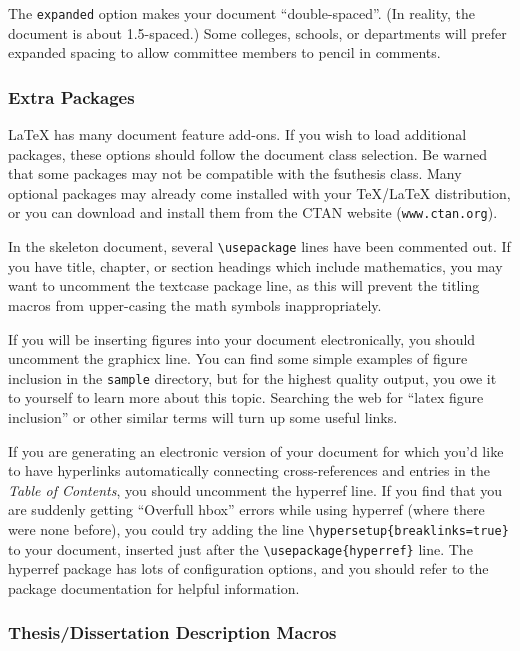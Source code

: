 \documentclass[11pt,letterpaper]{article}
\newcommand*{\acro}[1]{{\small\textsc{#1}}}
\newcommand*{\complit}[1]{\texttt{#1}}
\newcommand*{\latexclass}[1]{\textsf{#1}}
\newcommand*{\fsuth}{\latexclass{fsuthesis}}
\renewcommand{\-}{\discretionary{}{}{}}
\begin{document}
The \complit{expanded} option makes your document ``double-spaced''.
(In reality, the document is about 1.5-spaced.)  Some colleges, schools, or
departments will prefer expanded spacing to allow committee members to
pencil in comments.

\subsubsection{Extra Packages}

\LaTeX{} has many document feature add-ons.  If you wish to load
additional packages, these options should follow the document class
selection.  Be warned that some packages may not be compatible with
the \fsuth{} class.  Many optional packages may already come installed
with your \TeX/\LaTeX{} distribution, or you can download and install
them from the \acro{CTAN} website ({\tt www.ctan.org}).

In the skeleton document, several \verb|\usepackage| lines have
been commented out.  If you have title, chapter, or section headings
which include mathematics, you may want to uncomment the
\latexclass{textcase} package line, as this will prevent the
titling macros from upper-casing the math symbols inappropriately.

If you will be inserting figures into your document electronically,
you should uncomment the \latexclass{graphicx} line.  You can find
some simple examples of figure inclusion in the \complit{sample}
directory, but for the highest quality output, you owe it to yourself
to learn more about this topic.  Searching the web for ``latex figure
inclusion'' or other similar terms will turn up some useful links.

If you are generating an electronic version of your document
for which you'd like to have hyperlinks automatically connecting
cross-references and entries in the \textsl{Table of Contents}, you
should uncomment the \latexclass{hyperref} line.  If you find that you
are suddenly getting ``Overfull hbox'' errors while using
\latexclass{hyperref} (where there were none before), you could try
adding the line \verb+\hypersetup{breaklinks=true}+ to your document,
inserted just after the \verb+\usepackage{hyperref}+ line.  The
\latexclass{hyperref} package has lots of configuration options, and
you should refer to the package documentation for helpful information.

\subsubsection{Thesis/Dissertation Description Macros}
\end{document}
